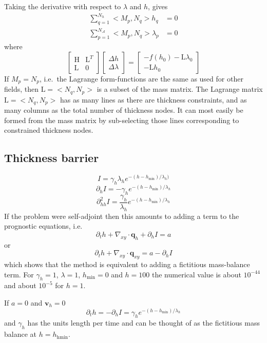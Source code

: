 \documentclass[10pt,a4paper]{book}
\newcommand{\p}{\partial}
\begin{document}
Taking the derivative with respect to
$\lambda$ and $h$, gives
\begin{align}
\sum_{q=1}^{N_h} <M_p,N_q> h_q &=0 \\
\sum_{p=1}^{N_{\mathcal{A}}}<M_p,N_q> \lambda_p &=0 
\end{align}
where
\[
\left [ \begin{array}{cc}
\mathrm{H} & \mathrm{L}^T  \\
\mathrm{L} & 0 
\end{array} \right ]
\left [ \begin{array}{c}
\Delta h \\
\Delta \lambda
\end{array} \right ]
=\left [ \begin{array}{c}
-f(h_0) -\mathrm{L} \lambda_0 \\
   -\mathrm{L} h_0
\end{array} \right ]
\]
If $M_p=N_p$, i.e.\ the Lagrange form-functions are the same as used
for other fields, then $\mathrm{L}=<N_q,N_p>$ is a subset of the mass
matrix. The Lagrange matrix $\mathrm{L}=<N_q,N_p>$ has as many lines
as there are thickness constraints, and as many columns as the total
number of thickness nodes. It can most easily be formed from the mass
matrix by sub-selecting those lines corresponding to constrained
thickness nodes.



\subsection{Thickness barrier}


\[ 
   I= \gamma_h \lambda_h  e^{-(h-h_{\mathrm{min}})/\lambda_h)}
\]
\[
\p_h I=-\gamma_h e^{-(h-h_{\mathrm{min}})/\lambda_h}
\]
\[
\p^2_{hh} I=\frac{\gamma_h}{\lambda_h} e^{-(h-h_{\mathrm{min}})/\lambda_h}
\]
If the problem were self-adjoint then this amounts to adding a term to
the prognostic equations, i.e.\
\[
\p_t h + \nabla_{xy} \cdot \bm{q}_h  +\p_h I = a
\]
or
\[
\p_t h + \nabla_{xy} \cdot \bm{q}_{xy}  = a -\p_h I
\]
which shows that the method is equivalent to adding a fictitious
mass-balance term. For $\gamma_h=1$, $\lambda=1$, $h_{\mathrm{min}}=0$
and $h=100$ the numerical value is about $10^{-44}$ and about
$10^{-5}$ for $h=1$.

If $a=0$ and $\bm{v}_h=0$
\[
\p_t h = -\p_h I = \gamma_h e^{-(h-h_{\mathrm{min}})/\lambda_h}
\]
and $\gamma_h$ has the units length per time and can be thought of as
the fictitious mass balance at $h=h_{\mathrm{hmin}}$.
\end{document}
